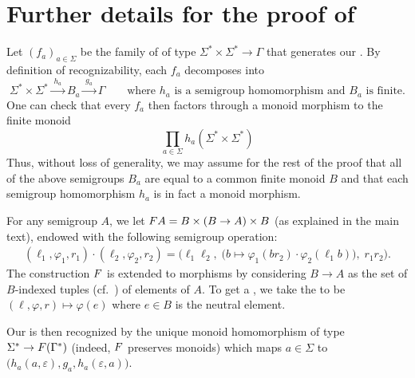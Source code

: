 \section{Further details for the proof of }

Let $(f_a)_{a\in\Sigma}$ be the family of  of type
$\Sigma^* \times \Sigma^* \to \Gamma$ that generates our . By
definition of recognizability, each $f_a$ decomposes into
\[ \Sigma^* \times \Sigma^* \xrightarrow{\;h_a\;} B_a \xrightarrow{\;g_a\;} \Gamma
  \qquad\text{where $h_a$ is a semigroup homomorphism and $B_a$ is finite.} \]
One can check that every $f_a$ then factors through a monoid morphism to the
finite monoid
\[ \prod_{a \in \Sigma} h_a(\Sigma^* \times \Sigma^*) \]
Thus, without loss of generality, we may assume for the rest of the proof that
all of the above semigroups $B_a$ are equal to a common finite monoid $B$ and
that each semigroup homomorphism $h_a$ is in fact a monoid morphism.

For any semigroup $A$, we let $\functor A = B \times (B\to A) \times B$ (as
explained in the main text), endowed with the following semigroup operation:
\begin{align*}
  (\ell_1,\varphi_1,r_1) \cdot (\ell_2,\varphi_2,r_2) = \Big(\ell_1\ell_2,\; \big(b  \mapsto \varphi_1(br_2) \cdot \varphi_2(\ell_1b)\big),\; r_1r_2\Big).
\end{align*}
The construction $\functor$ is extended to morphisms by considering $B\to A$ as the set of $B$-indexed tuples (cf.~) of
elements of $A$. To get a , we take the  to
be $(\ell,\varphi,r) \mapsto \varphi(e)$ where $e \in B$ is the neutral element.

Our  is then recognized by the unique monoid homomorphism of
type $\Sigma^* \to \functor(\Gamma^*)$ (indeed, $\functor$ preserves monoids)
which maps $a \in \Sigma$ to
$\big(h_a(a,\varepsilon),g_a,h_a(\varepsilon,a)\big)$.
